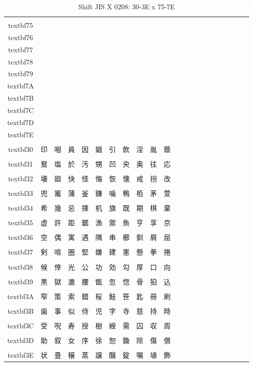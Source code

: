\begin{table}[H]
\centering
\caption{Shift JIS X 0208: 30-3E x 75-7E}
\begin{tabular}{|Sc|Sc|Sc|Sc|Sc|Sc|Sc|Sc|Sc|Sc|Sc|}
\hline
 & \\textbf{75} & \\textbf{76} & \\textbf{77} & \\textbf{78} & \\textbf{79} & \\textbf{7A} & \\textbf{7B} & \\textbf{7C} & \\textbf{7D} & \\textbf{7E} \\ \hline
\\textbf{30} & 印 & 咽 & 員 & 因 & 姻 & 引 & 飲 & 淫 & 胤 & 蔭 \\ \hline
\\textbf{31} & 鴛 & 塩 & 於 & 汚 & 甥 & 凹 & 央 & 奥 & 往 & 応 \\ \hline
\\textbf{32} & 壊 & 廻 & 快 & 怪 & 悔 & 恢 & 懐 & 戒 & 拐 & 改 \\ \hline
\\textbf{33} & 兜 & 竃 & 蒲 & 釜 & 鎌 & 噛 & 鴨 & 栢 & 茅 & 萱 \\ \hline
\\textbf{34} & 希 & 幾 & 忌 & 揮 & 机 & 旗 & 既 & 期 & 棋 & 棄 \\ \hline
\\textbf{35} & 虚 & 許 & 距 & 鋸 & 漁 & 禦 & 魚 & 亨 & 享 & 京 \\ \hline
\\textbf{36} & 空 & 偶 & 寓 & 遇 & 隅 & 串 & 櫛 & 釧 & 屑 & 屈 \\ \hline
\\textbf{37} & 剣 & 喧 & 圏 & 堅 & 嫌 & 建 & 憲 & 懸 & 拳 & 捲 \\ \hline
\\textbf{38} & 候 & 倖 & 光 & 公 & 功 & 効 & 勾 & 厚 & 口 & 向 \\ \hline
\\textbf{39} & 黒 & 獄 & 漉 & 腰 & 甑 & 忽 & 惚 & 骨 & 狛 & 込 \\ \hline
\\textbf{3A} & 窄 & 策 & 索 & 錯 & 桜 & 鮭 & 笹 & 匙 & 冊 & 刷 \\ \hline
\\textbf{3B} & 歯 & 事 & 似 & 侍 & 児 & 字 & 寺 & 慈 & 持 & 時 \\ \hline
\\textbf{3C} & 受 & 呪 & 寿 & 授 & 樹 & 綬 & 需 & 囚 & 収 & 周 \\ \hline
\\textbf{3D} & 助 & 叙 & 女 & 序 & 徐 & 恕 & 鋤 & 除 & 傷 & 償 \\ \hline
\\textbf{3E} & 状 & 畳 & 穣 & 蒸 & 譲 & 醸 & 錠 & 嘱 & 埴 & 飾 \\ \hline
\end{tabular}
\end{table}

